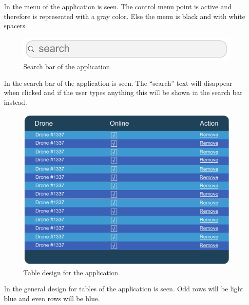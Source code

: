 In  the menu of the application is seen. The control menu point is active and therefore is represented with a gray color. Else the menu is black and with white spacers.

\begin{figure}[htb]
    \centering
    \includegraphics[width=\textwidth]{gfx/search.pdf}
    \caption{Search bar of the application}
    \label{fig:search_bar_design}
\end{figure}

In  the search bar of the application is seen. The ``search'' text will disappear when clicked and if the user types anything this will be shown in the search bar instead.

\begin{figure}[htb]
    \centering
    \includegraphics[width=\textwidth]{gfx/table.pdf}
    \caption{Table design for the application.}
    \label{fig:table_design}
\end{figure}

In  the general design for tables of the application is seen. Odd rows will be light blue and even rows will be blue.

